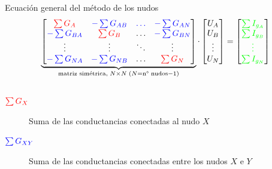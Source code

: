 \documentclass[aspectratio=169, xcolor={usenames,svgnames,dvipsnames}]{beamer}
\begin{document}
\begin{frame}{Ecuación general del método de los nudos}
    \vspace{3mm}
    \begin{equation*}
		\underbrace{\begin{bmatrix}
			{\color{red}\sum G_{A}} &  {\color{blue}-\sum G_{AB}} & {\color{blue}{\dots}} & {\color{blue}-\sum G_{AN}} \\
			{\color{blue}-\sum G_{BA}} & {\color{red}\sum G_{B}} & {{\dots}} & {\color{blue}-\sum G_{BN}} \\
			{\vdots} & {\vdots} &  {\ddots} & \vdots\\
			{\color{blue}-\sum G_{NA}} & {\color{blue}-\sum G_{NB}} & \dots & {\color{red}\sum G_{N}}
		\end{bmatrix}}_{\textrm{matriz simétrica}, \; N\times N \; (N=\textrm{n° nudos}-1)}  \cdot 
		\begin{bmatrix}
			U_A\\
			U_B\\
			\vdots\\
			U_N
		\end{bmatrix} = %
		\begin{bmatrix}
			{\color{green}\sum I_{g_A}}\\
			{\color{green}\sum I_{g_B}}\\
			{\color{green}\vdots}\\
			{\color{green}\sum I_{g_N}}
		\end{bmatrix}
	\end{equation*}

    \vspace{3mm}
    
    \begin{columns}
    \hspace*{-0.1cm}
    \begin{column}{1.01\textwidth} %
        \begin{description}
        \item[{\({\color{red}\sum G_{X}}\)}] Suma de las conductancias conectadas al nudo \(X\)
    
        \vspace{2mm}
        
        \item[{\({\color{blue}\sum G_{XY}}\)}] Suma de las conductancias conectadas entre los nudos \(X\) e \(Y\)
    
        \vspace{2mm}
        

\end{description}
\end{column}
\end{columns}
\end{frame}
\end{document}
